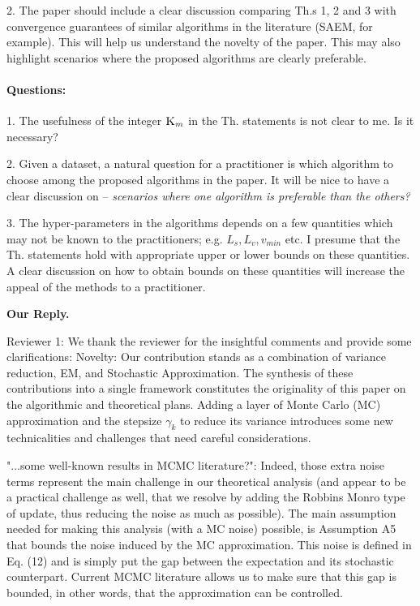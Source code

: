 \documentclass[anon,12pt]{alt2021} %
\begin{document}
2. The paper should include a clear discussion comparing Th.s 1, 2 and 3 with convergence guarantees of similar algorithms
in the literature (SAEM, for example). This will help us understand the novelty of the paper. This may also highlight scenarios where
the proposed algorithms are clearly preferable.


\paragraph{Questions:}


1. The usefulness of the integer $\textsc{K}_m$ in the Th. statements is not clear to me. Is it necessary?

2. Given a dataset, a natural question for a practitioner is which algorithm to choose among the proposed algorithms in the paper.
It will be nice to have a clear discussion on -- \textit{scenarios where one algorithm is preferable than the others?}

3. The hyper-parameters in the algorithms depends on a few quantities which may not be known to the practitioners; e.g. $L_s, L_v, v_{min}$ etc. I
presume that the Th. statements hold with appropriate upper or lower bounds on these quantities. A clear discussion on how to obtain
bounds on these quantities will increase the appeal of the methods to a practitioner.


\vspace{0.1in}
\textbf{Our Reply.}

Reviewer 1: We thank the reviewer for the insightful comments and provide some clarifications:
Novelty: Our contribution stands as a combination of variance reduction, EM, and Stochastic Approximation. 
The synthesis of these contributions into a single framework constitutes the originality of this paper on the algorithmic and theoretical plans.
Adding a layer of Monte Carlo (MC) approximation and the stepsize $\gamma_k$ to reduce its variance introduces some new technicalities and challenges that need careful considerations.

"...some well-known results in MCMC literature?": Indeed, those extra noise terms represent the main challenge in our theoretical analysis (and appear to be a practical challenge as well, that we resolve by adding the Robbins Monro type of update, thus reducing the noise as much as possible). The main assumption needed for making this analysis (with a MC noise) possible, is Assumption A5 that bounds the noise induced by the MC approximation. This noise is defined in Eq. (12) and is simply put the gap between the expectation and its stochastic counterpart. Current MCMC literature allows us to make sure that this gap is bounded, in other words, that the approximation can be controlled.
\end{document}
